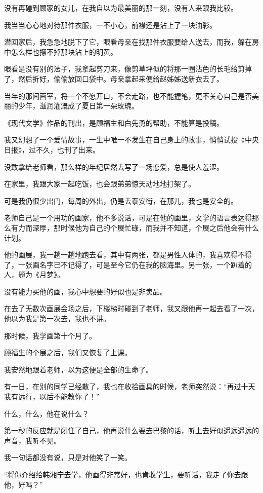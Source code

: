\par 没有再碰到顾家的女儿，在我自以为最美丽的那一刻，没有人来跟我比较。
\par 我当当心心地对待那件衣服，一不小心，前襟还是沾上了一块油彩。
\par 潜回家后，我急急地脱下了它，眼看母亲在找那件衣服要给人送去，而我，躲在房中怎么样也擦不掉那块沾上的明黄。
\par 眼看是没有别的法子，我拿起剪刀来，像剪草坪似的将那一圈沾色的长毛给剪掉了，然后折好，偷偷放回口袋中。母亲拿起来便给赵姊姊送新衣去了。
\par 当年的那间画室，将一个不愿开口，不会走路，也不能握笔，更不关心自己是否美丽的少年，滋润灌溉成了夏日第一朵玫瑰。
\par 《现代文学》作品的刊出，是顾福生和白先勇的帮助，不能算是投稿。
\par 我又幻想了一个爱情故事，一生中唯一不发生在自己身上的故事，悄悄试投《中央日报》，过不久，也刊了出来。
\par 没敢拿给老师看，那么样的年纪居然去写了一场恋爱，总是使人羞涩。
\par 在家里，我跟大家一起吃饭，也会跟弟弟惊天动地地打架了。
\par 可是我仍很少出门，每周的外出，仍是去泰安街，在那儿，我也是安全的。
\par 老师自己是一个用功的画家，他不多说话，可是在他的画里，文学的语言表达得那么有力而深厚，那时候他为自己的个展忙碌，而我并不知道，个展之后他会有什么计划。
\par 他的画展，我一趟一趟地跑去看，其中有两张，都是男性人体的，我喜欢得不得了，一张画名字已不记得了，可是至今它仍在我的脑海里。另一张，一个趴着的人，题为《月梦》。
\par 没有能力买他的画，我心中想要的好似也是非卖品。
\par 在去了无数次画展会场之后，下楼梯时碰到了老师，我又跟他再一起去看了一次，他以为我是第一次去，我也不讲。
\par 那时候，我学画第十个月了。
\par 顾福生的个展之后，我们又恢复了上课。
\par 我安然地跟着老师，以为这便是全部的生命了。
\par 有一日，在别的同学已经散了，我也在收拾画具的时候，老师突然说：“再过十天我有远行，以后不能教你了！”
\par 什么，什么，他在说什么？
\par 第一秒的反应就是闭住了自己，他再说什么要去巴黎的话，听上去好似遥远遥远的声音，我听不见。
\par 我一句话都没有说，只是对他笑了一笑。
\par “将你介绍给韩湘宁去学，他画得非常好，也肯收学生，要听话，我走了你去跟他，好吗？”
